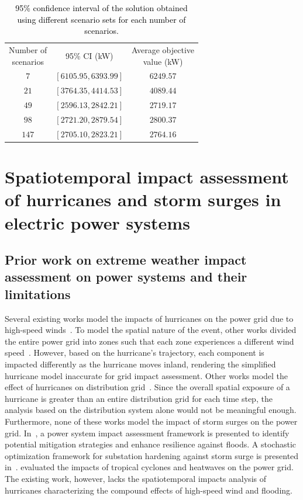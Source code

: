 
\begin{table}[h]
    \centering
        \caption{\textcolor{black}{95\% confidence interval of the solution obtained using different scenario sets for each number of scenarios.}}
        {\color{black}
        \begin{tabular}{c|c|c}
        \hline
             \makecell{Number of \\ scenarios} & 95\% CI (kW) & \makecell{Average objective \\ value (kW)} \\
        \hhline{===}
             $7$ & $\left[6105.95, 6393.99\right]$ & $6249.57$ \\
        \hline
            $21$ & $[3764.35, 4414.53]$ & $4089.44$ \\
        \hline
            $49$ & $[2596.13, 2842.21]$ & $2719.17$ \\
        \hline
            $98$ & $[2721.20, 2879.54]$ & $2800.37$ \\
        \hline
            $147$ & $[2705.10, 2823.21]$ & $2764.16$ \\
        \hline
        \end{tabular}}
        \label{tab:95_CI}
    \end{table}

\clearpage
\section{Spatiotemporal impact assessment of hurricanes and storm surges in electric power systems}
\subsection{Prior work on extreme weather impact assessment on power systems and their limitations}
Several existing works model the impacts of hurricanes on the power grid due to high-speed winds~\cite{7434044}. To model the spatial nature of the event, other works divided the entire power grid into zones such that each zone experiences a different wind speed~\cite{Trakas2018}. However, based on the hurricane's trajectory, each component is impacted differently as the hurricane moves inland, rendering the simplified hurricane model inaccurate for grid impact assessment. Other works model the effect of hurricanes on distribution grid~\cite{nguyen2019assessing}. Since the overall spatial exposure of a hurricane is greater than an entire distribution grid for each time step, the analysis based on the distribution system alone would not be meaningful enough.
Furthermore, none of these works model the impact of storm surges on the power grid. In~\cite{souto2022power}, a power system impact assessment framework is presented to identify potential mitigation strategies and enhance resilience against floods. A stochastic optimization framework for substation hardening against storm surge is presented in~\cite{shukla2021scenario}. \cite{Feng2022} evaluated the impacts of tropical cyclones and heatwaves on the power grid. The existing work, however, lacks the spatiotemporal impacts analysis of hurricanes characterizing the compound effects of high-speed wind and flooding. 

